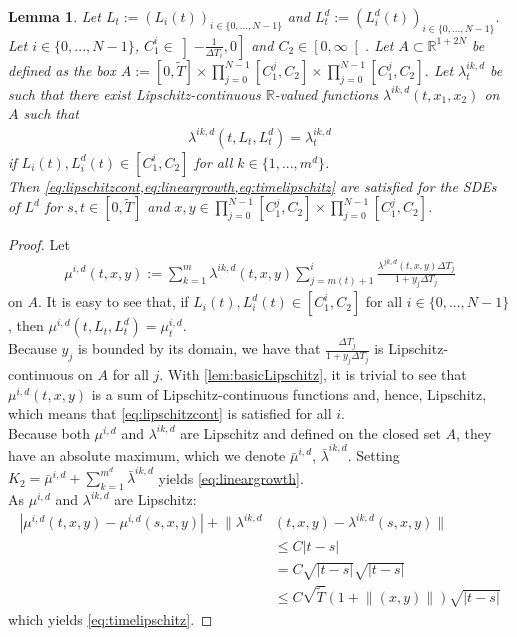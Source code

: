 \documentclass[12pt]{article}
\newtheorem{lemma}[theorem]{Lemma}
\begin{document}
	\begin{lemma}\label{lem:trickLipschitzforEuler}
		Let $L_t:=\left(L_i(t)\right)_{i\in\{0,...,N-1\}}$ and $L^d_t:=\left(L^d_i(t)\right)_{i\in\{0,...,N-1\}}$.
		Let $i \in \{0,...,N-1\}$, $C^i_1\in\left]-\frac{1}{\Delta T_i},0\right]$ and $C_2\in\left[0,\infty\right[$. Let $A\subset\mathbb{R}^{1+2N}$ be defined as the box $A:=\left[0, \tilde{T}\right] \times \prod_{j=0}^{N-1}\left[C^j_1, C_2\right]\times \prod_{j=0}^{N-1}\left[C^j_1, C_2\right]$. Let $\lambda^{i k,d}_t$ be such that there exist Lipschitz-continuous $\mathbb{R}$-valued functions $\lambda^{i k,d}(t,x_1,x_2)$ on $A$ such that 
		\begin{align*}
		\lambda^{i k,d}\left(t,L_t, L^d_t\right) = \lambda^{i k,d}_t
		\end{align*}
		if $L_i(t), L^{d}_i(t) \in \left[C^i_1, C_2\right]$ for all $k \in \{1,...,m^d\}$.\\
		Then \cref{eq:lipschitzcont,eq:lineargrowth,eq:timelipschitz} are satisfied for the SDEs of $L^d$ for $s,t\in \left[0,\tilde{T}\right]$ and $x,y\in\prod_{j=0}^{N-1}\left[C^j_1, C_2\right]\times \prod_{j=0}^{N-1}\left[C^j_1, C_2\right]$.
	\end{lemma}
	\begin{proof}
		Let
		\begin{align}\label{eq:driftasfunc}
			\mu^{i,d}(t,x,y) := \sum_{k=1}^{m}\lambda^{i k,d}\left(t,x,y\right)\sum_{j=m(t)+1}^{i}\frac{\lambda^{j k,d}\left(t,x,y\right) \Delta T_j}{1 + y_j\Delta T_j}
		\end{align}
		on $A$. It is easy to see that, if $L_i(t), L^{d}_i(t) \in \left[C^i_1, C_2\right]$ for all $i \in \{0,...,N-1\}$, then $
			\mu^{i,d}\left(t,L_t, L^d_t\right) = \mu^{i,d}_t$.\\
		Because $y_j$ is bounded by its domain, we have that $\frac{\Delta T_j}{1 + y_j\Delta T_j}$ is Lipschitz-continuous on $A$ for all $j$. With \cref{lem:basicLipschitz}, it is trivial to see that $\mu^{i,d}(t,x,y)$ is a sum of Lipschitz-continuous functions and, hence, Lipschitz, which means that \cref{eq:lipschitzcont} is satisfied for all $i$.\\
		Because both $\mu^{i,d}$ and $\lambda^{i k,d}$ are Lipschitz and defined on the closed set $A$, they have an absolute maximum, which we denote $\bar{\mu}^{i,d}$, $\bar{\lambda}^{i k,d}$. Setting $K_2 = \bar{\mu}^{i,d} + \sum_{k=1}^{m^d}\bar{\lambda}^{i k,d}$ yields \cref{eq:lineargrowth}.\\
		As $\mu^{i,d}$ and $\lambda^{i k,d}$ are Lipschitz:
		\begin{align*}
			|\mu^{i,d}(t,x,y) - \mu^{i,d}(s,x,y)| + \lVert\lambda^{i k,d}&\left(t,x,y\right) - \lambda^{i k,d}\left(s,x,y\right)\rVert \\
			&\le C |t - s|\\
			&= C \sqrt{|t - s|}\sqrt{|t - s|}\\
			&\le C \sqrt{\tilde{T}} \left(1 + \lVert (x,y)\rVert\right)\sqrt{|t - s|}
		\end{align*}
		which yields \cref{eq:timelipschitz}.
	\end{proof}
\end{document}
